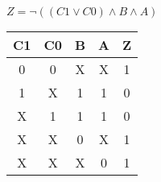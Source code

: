 
\begin{center}
    {\(Z = \lnot ((C1 \lor C0) \land B \land A) \)}
    \begin{table}[h] %
        \begin{center}
            \begin{tabular}{|c|c|c|c||c|} \hline
            C1 & C0 & B & A & Z \\ \hline\hline
            0  & 0  & X & X & 1 \\ \hline
            1  & X  & 1 & 1 & 0 \\ \hline
            X  & 1  & 1 & 1 & 0 \\ \hline
            X  & X  & 0 & X & 1 \\ \hline
            X  & X  & X & 0 & 1 \\ \hline
            \end{tabular}
        \end{center}
    \end{table}
\end{center}
